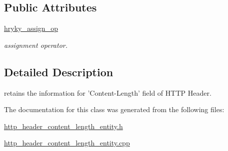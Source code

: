 \subsection*{Public Attributes}
\begin{DoxyCompactItemize}
\item 
\hypertarget{classhryky_1_1http_1_1header_1_1content_1_1length_1_1_entity_a2dda45b133ba2039436b69fed407102d}{\hyperlink{classhryky_1_1http_1_1header_1_1content_1_1length_1_1_entity_a2dda45b133ba2039436b69fed407102d}{hryky\-\_\-assign\-\_\-op}}\label{classhryky_1_1http_1_1header_1_1content_1_1length_1_1_entity_a2dda45b133ba2039436b69fed407102d}

\begin{DoxyCompactList}\small\item\em assignment operator. \end{DoxyCompactList}\end{DoxyCompactItemize}


\subsection{Detailed Description}
retains the information for 'Content-\/\-Length' field of H\-T\-T\-P Header. 

The documentation for this class was generated from the following files\-:\begin{DoxyCompactItemize}
\item 
\hyperlink{http__header__content__length__entity_8h}{http\-\_\-header\-\_\-content\-\_\-length\-\_\-entity.\-h}\item 
\hyperlink{http__header__content__length__entity_8cpp}{http\-\_\-header\-\_\-content\-\_\-length\-\_\-entity.\-cpp}\end{DoxyCompactItemize}
